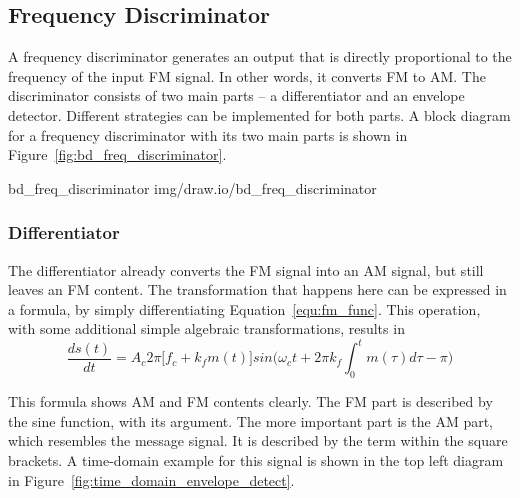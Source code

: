 
\subsection{Frequency Discriminator}

A frequency discriminator generates an output that is directly proportional to the frequency of the input FM signal.
In other words, it converts FM to AM.
The discriminator consists of two main parts -- a differentiator and an envelope detector.
Different strategies can be implemented for both parts.
A block diagram for a frequency discriminator with its two main parts is shown in Figure~\ref{fig:bd_freq_discriminator}.

 {bd_freq_discriminator} {img/draw.io/bd_freq_discriminator}

\subsubsection{Differentiator}

The differentiator already converts the FM signal into an AM signal, but still leaves an FM content.
The transformation that happens here can be expressed in a formula, by simply differentiating Equation~\eqref{equ:fm_func}.
This operation, with some additional simple algebraic transformations, results in
\begin{equation}
  \frac{d s(t)}{dt} = A_c 2 \pi \Big[f_c + k_f m(t) \Big] sin \Big(\omega_c t + 2 \pi k_f \int_{0}^{t} m(\tau) d\tau - \pi \Big)
  \label{equ:fm_demod_discriminator}
\end{equation}

This formula shows AM and FM contents clearly.
The FM part is described by the sine function, with its argument.
The more important part is the AM part, which resembles the message signal.
It is described by the term within the square brackets.
A time-domain example for this signal is shown in the top left diagram in Figure~\ref{fig:time_domain_envelope_detect}.\\

